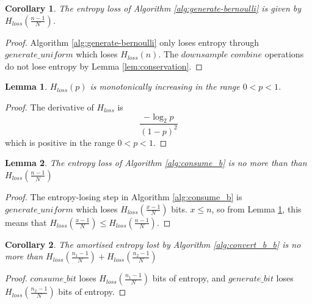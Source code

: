 \documentclass[12pt]{article}
\newtheorem{lemma}{Lemma}
\newtheorem{corollary}{Corollary}
\begin{document}
\begin{corollary}
The entropy loss of Algorithm \ref{alg:generate-bernoulli} is given by $H_{loss}(\frac{n-1}{N})$.
\end{corollary}

\begin{proof}
    Algorithm \ref{alg:generate-bernoulli} only loses entropy through $generate\_uniform$ which loses $H_{loss}(n)$. The $downsample$ $combine$ operations do not lose entropy by Lemma \ref{lem:conservation}.
\end{proof}

\begin{lemma}
    \label{lem:hloss_monotonic}
    $H_{loss}(p)$ is monotonically increasing in the range $0 < p < 1$.
\end{lemma}

\begin{proof}The derivative of $H_{loss}$ is
    \begin{equation}
        \frac{-\log_2p}{(1-p)^2}
    \end{equation}
    which is positive in the range $0 < p < 1$.
\end{proof}

\begin{lemma}
The entropy loss of Algorithm \ref{alg:consume_b} is no more than than $H_{loss}(\frac{n-1}{N})$
\end{lemma}

\begin{proof}
    The entropy-losing step in Algorithm \ref{alg:consume_b} is $generate\_uniform$ which loses $H_{loss}(\frac{x-1}{N})$ bits. $x \le n$, so from Lemma \ref{lem:hloss_monotonic}, this means that $H_{loss}(\frac{x-1}{N}) \le H_{loss}(\frac{n-1}{N})$.
\end{proof}

\begin{corollary}
The amortised entropy lost by Algorithm \ref{alg:convert_b_b} is no more than $H_{loss}(\frac{n_1-1}{N}) + H_{loss}(\frac{n_2-1}{N})$
\end{corollary}

\begin{proof}
    $consume\_bit$ loses $H_{loss}(\frac{n_1-1}{N})$ bits of entropy, and $generate\_bit$ loses $H_{loss}(\frac{n_2-1}{N})$ bits of entropy.
\end{proof}
\end{document}
